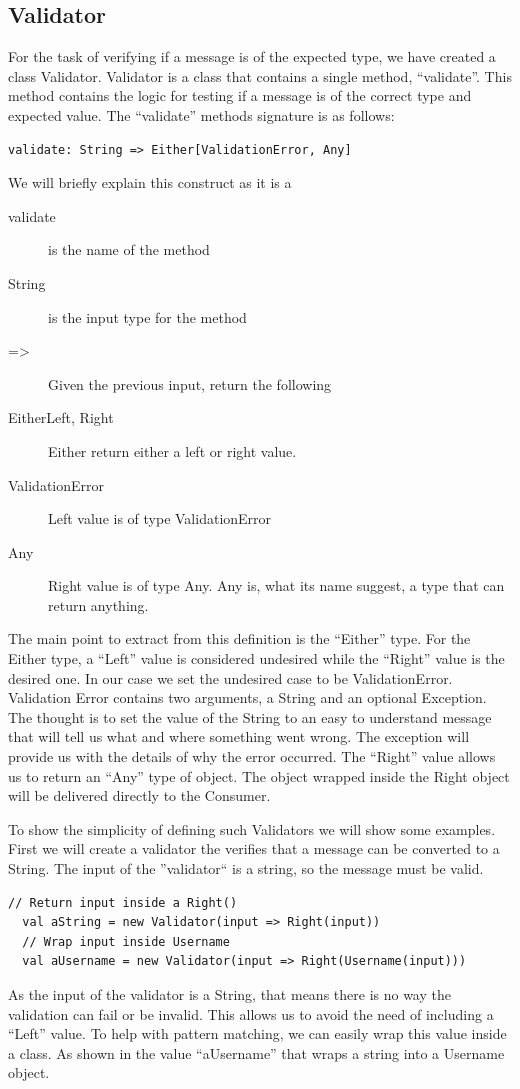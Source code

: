 \subsection{Validator}
\label{sec:validator}
For the task of verifying if a message is of the expected type, we have created a class Validator. Validator is a class that contains a single method, ``validate''. This method contains the logic for testing if a message is of the correct type and expected value. The ``validate'' methods signature is as follows:
\begin{lstlisting}[style=myScalastyle]
    validate: String => Either[ValidationError, Any]
\end{lstlisting}
We will briefly explain this construct as it is a 
\begin{description}
 \item[validate] is the name of the method
 \item[String] is the input type for the method
 \item[=>] Given the previous input, return the following
 \item[Either\lbrack Left, Right\rbrack] Either return either a left or right value.
 \item[ValidationError] Left value is of type ValidationError
 \item[Any] Right value is of type Any. Any is, what its name suggest, a type that can return anything.
\end{description}
The main point to extract from this definition is the ``Either'' type. For the Either type, a ``Left'' value is considered undesired while the ``Right'' value is the desired one. In our case we set the undesired case to be ValidationError. Validation Error contains two arguments, a String and an optional Exception. The thought is to set the value of the String to an easy to understand message that will tell us what and where something went wrong. The exception will provide us with the details of why the error occurred. The ``Right'' value allows us to return an ``Any'' type of object. The object wrapped inside the Right object will be delivered directly to the Consumer. 

To show the simplicity of defining such Validators we will show some examples. First we will create a validator the verifies that a message can be converted to a String. The input of the ''validator`` is a string, so the message must be valid.
\begin{lstlisting}[style=myScalastyle]
  // Return input inside a Right()
  val aString = new Validator(input => Right(input))
  // Wrap input inside Username
  val aUsername = new Validator(input => Right(Username(input)))
\end{lstlisting}
As the input of the validator is a String, that means there is no way the validation can fail or be invalid. This allows us to avoid the need of including a ``Left'' value. To help with pattern matching, we can easily wrap this value inside a class. As shown in the value ``aUsername'' that wraps a string into a Username object.

